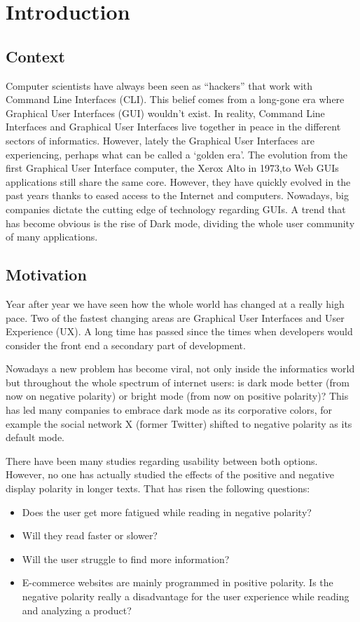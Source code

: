 \chapter{Introduction}
\label{chap:intro}

\section{Context}
Computer scientists have always been seen as “hackers” that work with Command Line Interfaces (CLI). 
This belief comes from a long-gone era where Graphical User Interfaces (GUI) wouldn’t exist. In reality, 
Command Line Interfaces and Graphical User Interfaces live together in peace in the different sectors of informatics. 
However, lately the Graphical User Interfaces are experiencing, perhaps what can be called a ‘golden era’. 
The evolution from the first Graphical User Interface computer, the Xerox Alto in 1973\cite{wikipedia_gui},to Web GUIs applications 
still share the same core. However, they have quickly evolved in the past years thanks to eased access to the Internet 
and computers. Nowadays, big companies dictate the cutting edge of technology regarding GUIs. A trend that 
has become obvious is the rise of Dark mode, dividing the whole user community of many applications.

\section{Motivation}
Year after year we have seen how the whole world has changed at a really high pace. Two of the fastest 
changing areas are Graphical User Interfaces and User Experience (UX). A long time has passed since the 
times when developers would consider the front end a secondary part of development. 

Nowadays a new problem has become viral, not only inside the informatics world but throughout the whole 
spectrum of internet users: is dark mode better (from now on negative polarity) or bright mode (from now on 
positive polarity)? This has led many companies to embrace dark mode as its corporative colors, for example 
the social network X (former Twitter) shifted to negative polarity as its default mode. 

There have been many studies regarding usability between both options. However, no one has actually studied 
the effects of the positive and negative display polarity in longer texts. That has risen the following questions:
\begin{itemize}
    \item Does the user get more fatigued while reading in negative polarity?
    \item Will they read faster or slower?
    \item Will the user struggle to find more information?
    \item E-commerce websites are mainly programmed in positive polarity. Is the negative polarity really a disadvantage for the 
    user experience while reading and analyzing a product?
\end{itemize}

